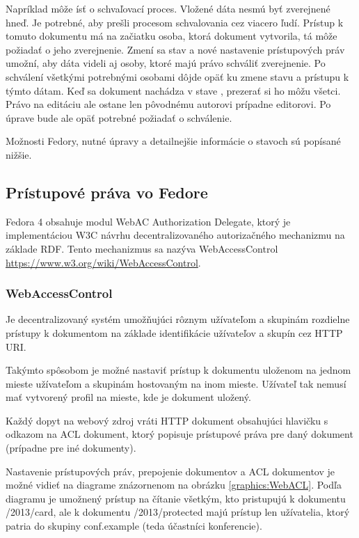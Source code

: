 \documentclass[thesis=M,slovak]{FITthesis}[2013/05/06]
\begin{document}
Napríklad môže ísť o schvaľovací proces. Vložené dáta nesmú byť zverejnené hneď. Je potrebné, aby prešli procesom schvalovania cez viacero ľudí. Prístup k tomuto dokumentu má na začiatku osoba, ktorá dokument vytvorila, tá môže požiadať o jeho zverejnenie. Zmení sa stav a nové nastavenie prístupových práv umožní, aby dáta videli aj osoby, ktoré majú právo schváliť zverejnenie. Po schválení všetkými potrebnými osobami dôjde opäť ku zmene stavu a prístupu k týmto dátam. Keď sa dokument nachádza v stave , prezerať si ho môžu všetci. Právo na editáciu ale ostane len pôvodnému autorovi prípadne editorovi. Po úprave bude ale opäť potrebné požiadať o schválenie.

Možnosti Fedory, nutné úpravy a detailnejšie informácie o stavoch sú popísané nižšie.

\subsection{Prístupové práva vo Fedore}
Fedora 4 obsahuje modul WebAC Authorization Delegate, ktorý je implementáciou W3C návrhu decentralizovaného autorizačného mechanizmu na základe RDF. Tento mechanizmus sa nazýva WebAccessControl \url{https://www.w3.org/wiki/WebAccessControl}.

\subsubsection{WebAccessControl}
Je decentralizovaný systém umožňujúci rôznym užívateľom a skupinám rozdielne prístupy k dokumentom na základe identifikácie užívateľov a skupín cez HTTP URI. 

Takýmto spôsobom je možné nastaviť prístup k dokumentu uloženom na jednom mieste užívateľom a skupinám hostovaným na inom mieste. Užívateľ tak nemusí mať vytvorený profil na mieste, kde je dokument uložený.

Každý dopyt na webový zdroj vráti HTTP dokument obsahujúci hlavičku s odkazom na ACL dokument, ktorý popisuje prístupové práva pre daný dokument (prípadne pre iné dokumenty).
\cite{WebAccessControl}

Nastavenie prístupových práv, prepojenie dokumentov a ACL dokumentov je možné vidieť na diagrame znázornenom na obrázku \ref{graphics:WebACL}. Podľa diagramu je umožnený prístup na čítanie všetkým, kto pristupujú k dokumentu /2013/card, ale k dokumentu /2013/protected majú prístup len užívatelia, ktorý patria do skupiny conf.example (teda účastníci konferencie).
\end{document}
